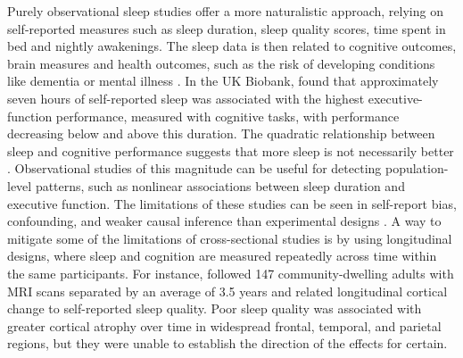 \documentclass[12pt,a4paper]{report}
\begin{document}
Purely observational sleep studies offer a more naturalistic approach, relying on self-reported measures such as sleep duration, sleep quality scores, time spent in bed and nightly awakenings. The sleep data is then related to cognitive outcomes, brain measures and health outcomes, such as the risk of developing conditions like dementia or mental illness \parencite{sen2023sleepef, Shokri-Kojori2018beta-amyloid, alvaro2013sleepdepression}. In the UK Biobank, \textcite{tai2022sleepef} found that approximately seven hours of self-reported sleep was associated with the highest executive-function performance, measured with cognitive tasks, with performance decreasing below and above this duration. The quadratic relationship between sleep and cognitive performance suggests that more sleep is not necessarily better \parencite{sen2023sleepef,tai2022sleepef}. Observational studies of this magnitude can be useful for detecting population-level patterns, such as nonlinear associations between sleep duration and executive function. The limitations of these studies can be seen in self-report bias, confounding, and weaker causal inference than experimental designs \parencite{sen2023sleepef,tai2022sleepef}. A way to mitigate some of the limitations of cross-sectional studies is by using longitudinal designs, where sleep and cognition are measured repeatedly across time within the same participants. For instance, \textcite{sexton2014sleepatrophy} followed 147 community-dwelling adults with MRI scans separated by an average of 3.5 years and related longitudinal cortical change to self-reported sleep quality. Poor sleep quality was associated with greater cortical atrophy over time in widespread frontal, temporal, and parietal regions, but they were unable to establish the direction of the effects for certain.
\end{document}
